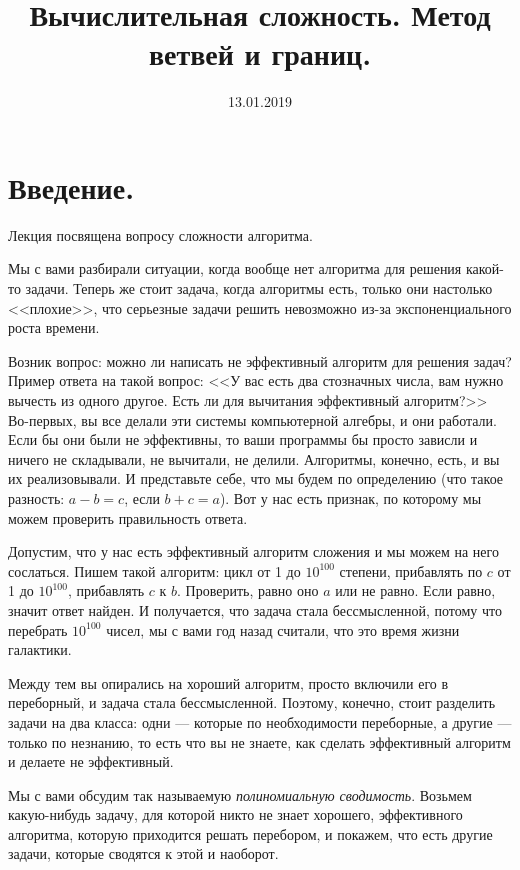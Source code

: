\documentclass[russian]{lecture-notes}
\title{Вычислительная сложность. Метод ветвей и границ.}
\date{13.01.2019}
\theoremstyle{definition}
\begin{document}
	
	\maketitle
	
	\section*{Введение.}
	
	Лекция посвящена вопросу сложности алгоритма. 

	Мы с вами разбирали ситуации, когда вообще нет алгоритма для решения какой-то задачи. Теперь же стоит задача, когда алгоритмы есть, только они настолько <<плохие>>, что серьезные задачи решить невозможно из-за экспоненциального роста времени.
	
	Возник вопрос: можно ли написать не эффективный алгоритм для решения задач? Пример ответа на такой вопрос: <<У вас есть два стозначных числа, вам нужно вычесть из одного другое. Есть ли для вычитания эффективный алгоритм?>>	Во-первых, вы все делали эти системы компьютерной алгебры, и они работали.
	Если бы они были не эффективны, то ваши программы бы просто зависли и ничего не складывали, не вычитали, не делили. Алгоритмы, конечно, есть, и вы их реализовывали. И представьте себе, что мы будем по определению (что такое разность: $a - b = c$, если $b + c = a$).
	Вот у нас есть признак, по которому мы можем проверить правильность ответа. 
	
	Допустим, что у нас есть эффективный алгоритм сложения и мы можем на него сослаться. Пишем такой алгоритм: цикл от 1 до $10^100$ степени, прибавлять по $c$ от 1 до $10^100$, прибавлять $c$ к $b$. Проверить, равно оно $a$ или не равно. Если равно, значит ответ найден.
	И получается, что задача стала бессмысленной, потому что перебрать $10^100$ чисел, мы с вами год назад считали, что это время жизни галактики.
	
	Между тем  вы опирались на хороший алгоритм, просто включили его в переборный, и задача стала бессмысленной.
	Поэтому, конечно, стоит разделить задачи на два класса: одни --- которые по необходимости переборные, а другие --- только по незнанию, то есть что вы не знаете, как сделать эффективный алгоритм и делаете не эффективный.
	
	Мы с вами обсудим так называемую {\em полиномиальную сводимость}. Возьмем какую-нибудь задачу, для которой никто не знает хорошего, эффективного алгоритма, которую приходится решать перебором, и покажем, что есть другие задачи, которые сводятся к этой и наоборот.
	
\end{document}
